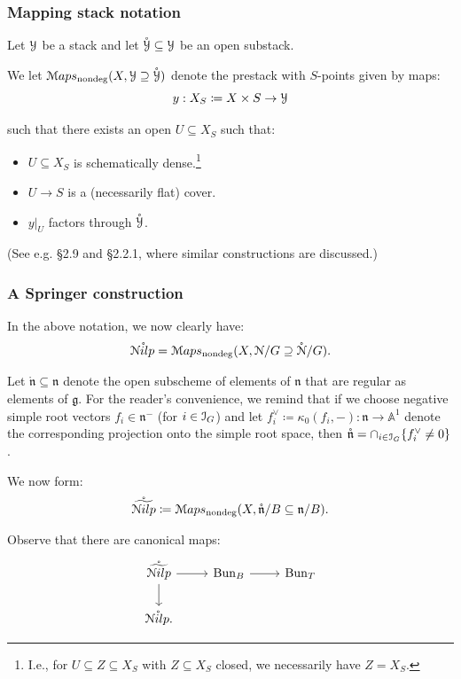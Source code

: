 \documentclass[reqno,11pt]{amsart}
\numberwithin{equation}{subsection}
\theoremstyle{remark}
\newcommand{\bA}{{\mathbb A}}
\newcommand{\sI}{{\EuScript I}}
\newcommand{\sM}{{\EuScript M}}
\newcommand{\sN}{{\EuScript N}}
\newcommand{\sY}{{\EuScript Y}}
\newcommand{\fg}{{\mathfrak g}}
\newcommand{\fn}{{\mathfrak n}}
\newcommand{\on}{\operatorname}
\newcommand{\Bun}{\on{Bun}}
\newcommand{\Maps}{\sM aps}
\renewcommand{\o}[1]{\mathring{#1}}
\renewcommand{\subset}{\subseteq}
\renewcommand{\supset}{\supseteq}
\newcommand{\Nilp}{\sN ilp}
\begin{document}
\subsubsection{Mapping stack notation}

Let $\sY$ be a stack and let $\o{\sY} \subset \sY$ be an open substack. 

We let $\Maps_{\on{nondeg}}(X,\sY \supset \o{\sY})$ denote the
prestack with $S$-points given by maps:
%
\[
y:X_S \coloneqq X \times S \to \sY
\]

\noindent such that there exists an open $U \subset X_S$ 
such that:
%
\begin{itemize}

\item $U \subset X_S$ is schematically dense.\footnote{I.e., 
for $U \subset Z \subset X_S$ with $Z \subset X_S$ closed, we necessarily
have $Z = X_S$.}

\item $U \to S$ is a (necessarily flat) cover.

\item $y|_U$ factors through $\o{\sY}$.

\end{itemize}

(See e.g. \cite{cpsi} \S 2.9 and \cite{schieder} \S 2.2.1, where similar
constructions are discussed.)

\subsubsection{A Springer construction}\label{sss:springer-desc}

In the above notation, we now clearly have:
%
\[
\o{\Nilp} = \Maps_{\on{nondeg}}(X,\sN/G \supset \o{\sN}/G).
\]

Let $\o{\fn} \subset \fn$ denote the open subscheme 
of elements of $\fn$ that are regular as elements of $\fg$.
For the reader's convenience, we remind that if we choose 
negative simple root vectors $f_i \in \fn^-$ (for $i \in \sI_G$) and let
$f_i^{\vee} \coloneqq \kappa_0(f_i,-):\fn \to \bA^1$ denote the
corresponding projection onto the simple root space, then
$\o{\fn} = \cap_{i \in \sI_G} \{f_i^{\vee} \neq 0\}$.

We now form:
%
\[
\o{\widetilde{\Nilp}} \coloneqq \Maps_{\on{nondeg}}(X,\o{\fn}/B \subset \fn/B).
\]

\noindent Observe that there are canonical maps:
%
\[
\begin{tikzcd}
\o{\widetilde{\Nilp}} 
\arrow[d] 
\arrow[r] 
&
\Bun_B
\arrow[r]
&
\Bun_T
\\
\o{\Nilp}.
\end{tikzcd}
\]
\end{document}
